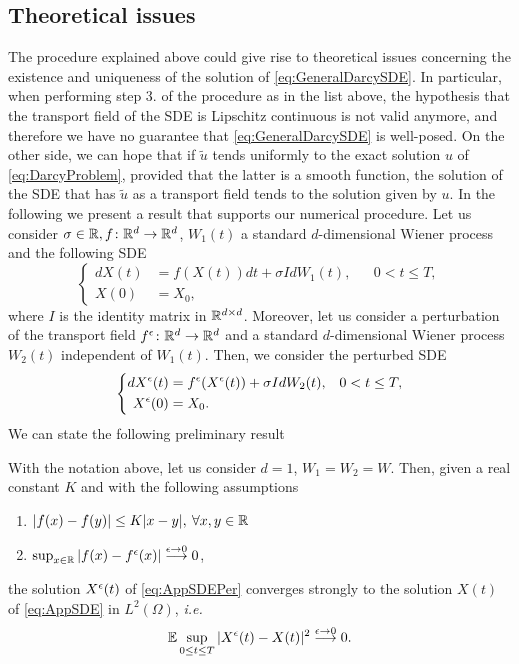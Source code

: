 \subsection{Theoretical issues}
The procedure explained above could give rise to theoretical issues concerning the existence and uniqueness of the solution of \eqref{eq:GeneralDarcySDE}. In particular, when performing step 3. of the procedure as in the list above, the hypothesis that the transport field of the SDE is Lipschitz continuous is not valid anymore, and therefore we have no guarantee that \eqref{eq:GeneralDarcySDE} is well-posed. On the other side, we can hope that if $\tilde{u}$ tends uniformly to the exact solution $u$ of \eqref{eq:DarcyProblem}, provided that the latter is a smooth function, the solution of the SDE that has $\tilde{u}$ as a transport field tends to the solution given by $u$. In the following we present a result that supports our numerical procedure. Let us consider $\sigma \in \mathbb{R}, f\colon \mathbb{R}^d \rightarrow \mathbb{R}^d$, $W_1(t)$ a standard $d$-dimensional Wiener process and the following SDE
\begin{equation}\label{eq:AppSDE}
\left \{
\begin{aligned}
	dX(t) &= f(X(t))dt + \sigma IdW_1(t), && 0 < t \leq T, \\
	X(0) &= X_0,
\end{aligned} \right .
\end{equation}
where $I$ is the identity matrix in $\mathbb{R}^{d\times d}$. Moreover, let us consider a perturbation of the transport field $f^\epsilon\colon \mathbb{R}^d \rightarrow \mathbb{R}^d$ and a standard $d$-dimensional Wiener process $W_2(t)$ independent of $W_1(t)$. Then, we consider the perturbed SDE 
\begin{equation}\label{eq:AppSDEPer}
\left \{
\begin{aligned}
	dX^\epsilon(t) &= f^\epsilon(X^\epsilon(t)) + \sigma I dW_2(t), && 0 < t \leq T, \\
	X^\epsilon(0) &= X_0.
\end{aligned} \right .
\end{equation}
We can state the following preliminary result
\begin{lemma}\label{lem:Lemma1} With the notation above, let us consider $d = 1$, $W_1 = W_2 = W$. Then, given a real constant $K$ and with the following assumptions
\begin{enumerate}
	\item $|f(x) - f(y)| \leq K|x - y|, \: \forall x,y \in \mathbb{R}$
 	\item $\sup_{x\in \mathbb{R}}|f(x) - f^\epsilon(x)| \stackrel{\epsilon \rightarrow 0}\longrightarrow 0$,
\end{enumerate}
the solution $X^\epsilon(t)$ of \eqref{eq:AppSDEPer} converges strongly to the solution $X(t)$ of \eqref{eq:AppSDE} in $L^2(\Omega)$, \textit{i.e.}
\begin{equation*}
	\mathbb{E} \sup_{0 \leq t \leq T} |X^\epsilon(t) - X(t)|^2 \stackrel{\epsilon \rightarrow 0}\longrightarrow 0.
\end{equation*}
\end{lemma}

